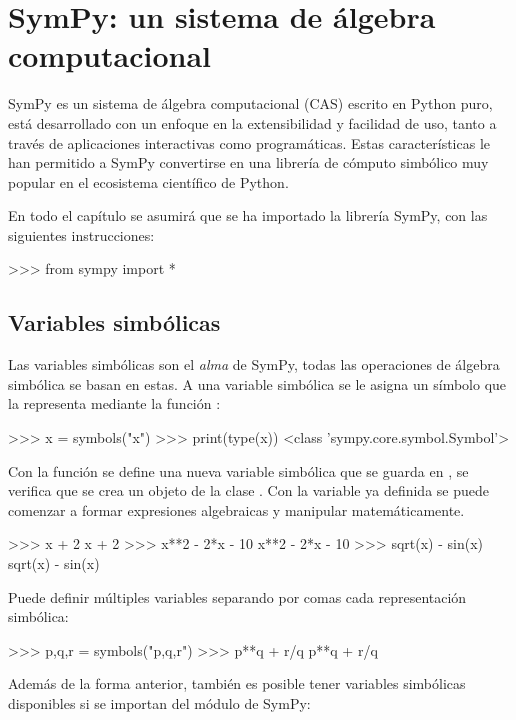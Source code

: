 \chapter{SymPy: un sistema de álgebra computacional}

SymPy es un sistema de álgebra computacional (CAS) escrito en Python puro, está desarrollado con un enfoque 
en la extensibilidad y facilidad de uso, tanto a través de aplicaciones interactivas como programáticas. Estas 
características le han permitido a SymPy convertirse en una librería de cómputo simbólico muy popular en 
el ecosistema científico de Python. \cite{sympy2017}

En todo el capítulo se asumirá que se ha importado la librería SymPy, con las siguientes instrucciones:

\begin{python}
>>> from sympy import *
\end{python}

\section{Variables simbólicas}

Las variables simbólicas son el \textit{alma} de SymPy, todas las operaciones de álgebra simbólica se basan en estas. 
A una variable simbólica se le asigna un símbolo que la representa mediante la función :

\begin{python}
>>> x = symbols("x")
>>> print(type(x))
<class 'sympy.core.symbol.Symbol'>
\end{python}

Con la función  se define una nueva variable simbólica que se guarda en , se verifica 
que se crea un objeto de la clase . Con la variable  ya definida se puede comenzar 
a formar expresiones algebraicas y manipular matemáticamente.

\begin{python}
>>> x + 2
x + 2
>>> x**2 - 2*x - 10
x**2 - 2*x - 10
>>> sqrt(x) - sin(x)
sqrt(x) - sin(x)
\end{python}

Puede definir múltiples variables separando por comas cada representación simbólica:

\begin{python}
>>> p,q,r = symbols("p,q,r")
>>> p**q + r/q
p**q + r/q
\end{python}

Además de la forma anterior, también es posible tener variables simbólicas disponibles si se importan 
del módulo  de SymPy:

